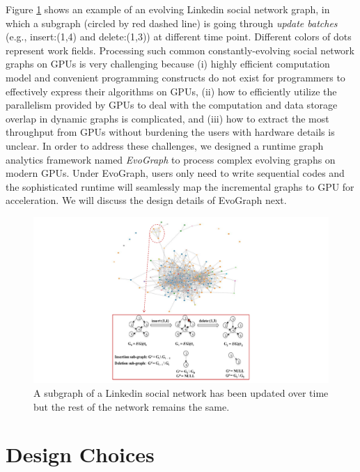 Figure \ref{fig:link} shows an example of an evolving Linkedin social network graph, in which a subgraph (circled by red dashed line) is going through \textit{update batches} (e.g., insert:(1,4) and delete:(1,3)) at different time point. Different colors of dots represent work fields. Processing such common constantly-evolving social network graphs on GPUs is very challenging because (i) highly efficient computation model and convenient programming constructs do not exist for programmers to effectively express their algorithms on GPUs, (ii) how to efficiently utilize the parallelism provided by GPUs to deal with the computation and data storage overlap in dynamic graphs is complicated, and (iii) how to extract the most throughput from GPUs without burdening the users with hardware details is unclear. In order to address these challenges, we designed a runtime graph analytics framework named \textit{EvoGraph} to process complex evolving graphs on modern GPUs. Under EvoGraph, users only need to write sequential codes and the sophisticated runtime will seamlessly map the incremental graphs to GPU for acceleration. We will discuss the design details of EvoGraph next. 



\begin{figure}[!t]
\centering
\includegraphics [width=1\columnwidth]{figures/link.pdf}
\caption{A subgraph of a Linkedin social network has been updated over time but the rest of the network remains the same. }
\label{fig:link}
\end{figure}



\section{Design Choices}

